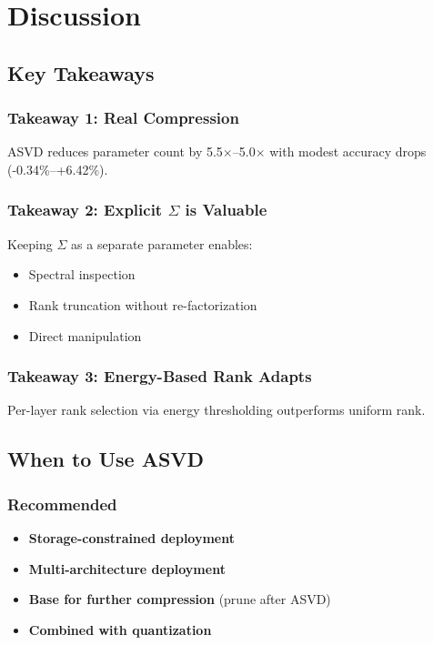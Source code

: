 
\section{Discussion}

\subsection{Key Takeaways}

\subsubsection{Takeaway 1: Real Compression}

ASVD reduces parameter count by 5.5$\times$--5.0$\times$ with modest 
accuracy drops (-0.34\%--+6.42\%).

\subsubsection{Takeaway 2: Explicit $\Sigma$ is Valuable}

Keeping $\Sigma$ as a separate parameter enables:
\begin{itemize}
\item Spectral inspection
\item Rank truncation without re-factorization
\item Direct manipulation

\end{itemize}
\subsubsection{Takeaway 3: Energy-Based Rank Adapts}

Per-layer rank selection via energy thresholding outperforms uniform rank.

\subsection{When to Use ASVD}

\subsubsection{Recommended}

\begin{itemize}
\item \textbf{Storage-constrained deployment}
\item \textbf{Multi-architecture deployment}
\item \textbf{Base for further compression} (prune after ASVD)
\item \textbf{Combined with quantization}

\end{itemize}

